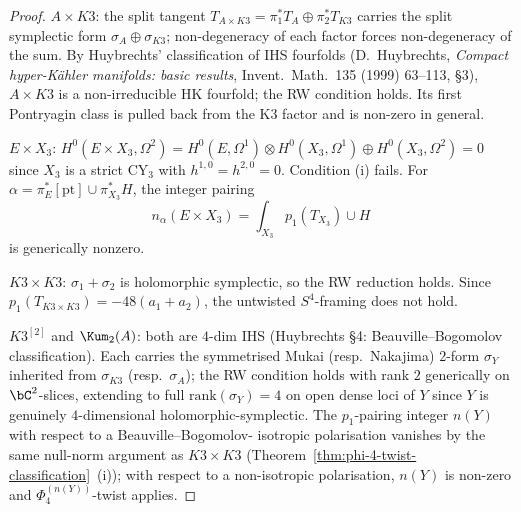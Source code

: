 \begin{proof}
\(A\times K3\): the split tangent \(T_{A\times K3}=\pi_1^*T_A\oplus
\pi_2^*T_{K3}\) carries the split symplectic form \(\sigma_A\oplus
\sigma_{K3}\); non-degeneracy of each factor forces non-degeneracy of
the sum. By Huybrechts' classification of IHS fourfolds
\textup{(}D.\ Huybrechts, \emph{Compact hyper-K\"ahler manifolds:
basic results}, Invent.\ Math.~135 \textup{(}1999\textup{)} 63--113,
\S 3\textup{)}, \(A\times K3\) is a non-irreducible HK fourfold; the RW
condition holds. Its first Pontryagin class is pulled back from the K3
factor and is non-zero in general.

\(E\times X_3\): $H^0(E \times X_3, \Omega^2) = H^0(E, \Omega^1) \otimes
H^0(X_3, \Omega^1) \oplus H^0(X_3, \Omega^2) = 0$ since $X_3$ is a
strict CY${}_3$ with $h^{1,0} = h^{2,0} = 0$. Condition
\textup{(}i\textup{)} fails. For
\(\alpha=\pi_E^*[\mathrm{pt}]\cup\pi_{X_3}^*H\), the integer pairing
\[
 n_\alpha(E\times X_3)
 =
 \int_{X_3}p_1(T_{X_3})\cup H
\]
is generically nonzero.

\(K3\times K3\): \(\sigma_1+\sigma_2\) is holomorphic symplectic, so the
RW reduction holds. Since \(p_1(T_{K3\times K3})=-48(a_1+a_2)\), the
untwisted \(S^4\)-framing does not hold.

\(K3^{[2]}\) and \(\Kum_2(A)\): both are $4$-dim IHS
\textup{(}Huybrechts \S 4: Beauville--Bogomolov classification\textup{).}
Each carries the symmetrised Mukai (resp.\ Nakajima) $2$-form $\sigma_Y$
inherited from \(\sigma_{K3}\) \textup{(}resp.\ \(\sigma_A\)\textup{);} the
RW condition holds with rank $2$ generically on $\bC^2$-slices,
extending to full $\mathrm{rank}(\sigma_Y) = 4$ on open dense loci of
$Y$ since $Y$ is genuinely $4$-dimensional holomorphic-symplectic. The
$p_1$-pairing integer $n(Y)$ with respect to a Beauville--Bogomolov-
isotropic polarisation vanishes by the same null-norm argument as
$K3 \times K3$
\textup{(}Theorem~\ref{thm:phi-4-twist-classification}~(i)\textup{);}
with respect to a non-isotropic polarisation, $n(Y)$ is non-zero and
$\Phi_4^{(n(Y))}$-twist applies.
\end{proof}

